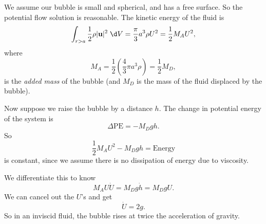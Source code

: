 \documentclass[a4paper]{article}
\begin{document}
\begin{eg}
  We assume our bubble is small and spherical, and has a free surface. So the potential flow solution is reasonable. The kinetic energy of the fluid is
  \[
    \int_{r > a} \frac{1}{2}\rho |\mathbf{u}|^2 \;\d V = \frac{\pi}{3} a^3 \rho U^2 = \frac{1}{2}M_A U^2,
  \]
  where
  \[
    M_A = \frac{1}{2} \left(\frac{4}{3} \pi a^3 \rho\right) = \frac{1}{2} M_D,
  \]
  is the \emph{added mass} of the bubble (and $M_D$ is the mass of the fluid displaced by the bubble).

  Now suppose we raise the bubble by a distance $h$. The change in potential energy of the system is
  \[
    \Delta\mathrm{PE} = -M_D gh.
  \]
  So
  \[
    \frac{1}{2} M_A U^2 - M_D gh = \mathrm{Energy}
  \]
  is constant, since we assume there is no dissipation of energy due to viscosity.

  We differentiate this to know
  \[
    M_A U \dot{U} = M_D g \dot{h} = M_D gU.
  \]
  We can cancel out the $U$'s and get
  \[
    \dot{U} = 2g.
  \]
  So in an inviscid fluid, the bubble rises at twice the acceleration of gravity.
\end{eg}
\end{document}
